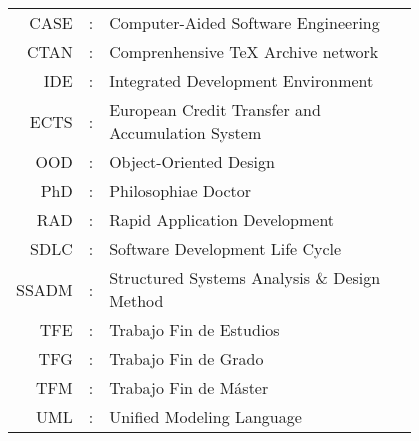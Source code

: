 \begin{tabular}{r r p{0.8\linewidth}}
CASE& : &Computer-Aided Software Engineering \\
CTAN& : &Comprenhensive \TeX{} Archive network \\
IDE& : &Integrated Development Environment \\
ECTS& : &European Credit Transfer and Accumulation System \\
OOD& : &Object-Oriented Design \\
PhD& : &Philosophiae Doctor \\
RAD& : &Rapid Application Development \\
SDLC& : &Software Development Life Cycle \\
SSADM& : &Structured Systems Analysis \& Design Method \\
TFE& : &Trabajo Fin de Estudios \\
TFG& : &Trabajo Fin de Grado \\
TFM& : &Trabajo Fin de Máster \\
UML& : &Unified Modeling Language
\end{tabular}

\idxGral
\idxFiguras
\idxTablas
\idxListados
\idxAlgoritmos


